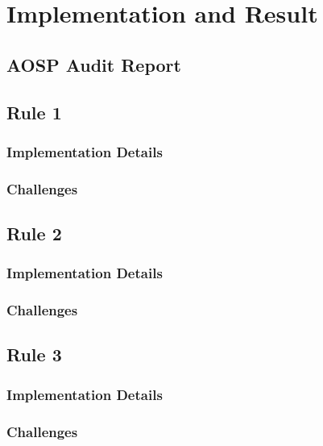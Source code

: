 \chapter{Implementation and Result}
\section{AOSP Audit Report}


\section{Rule 1}
	\subsection{Implementation Details}
    \subsection{Challenges}
  
 \section{Rule 2}
 \subsection{Implementation Details}
 \subsection{Challenges}
 
 \section{Rule 3}
 \subsection{Implementation Details}
 \subsection{Challenges}
 
